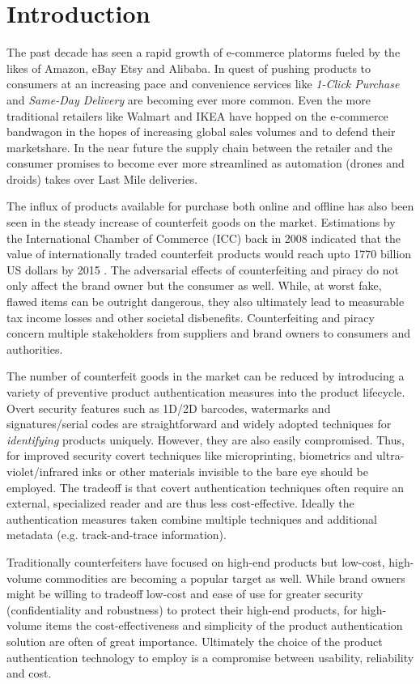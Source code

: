 \documentclass[thesis.tex]{subfiles}
\begin{document}
\chapter{Introduction}
\label{chapter:intro}

The past decade has seen a rapid growth of e-commerce platorms fueled by the likes of Amazon, eBay Etsy and Alibaba. In quest of pushing products to consumers at an increasing pace and convenience services like \emph{1-Click Purchase} and \emph{Same-Day Delivery} are becoming ever more common. Even the more traditional retailers like Walmart and IKEA have hopped on the e-commerce bandwagon in the hopes of increasing global sales volumes and to defend their marketshare. In the near future the supply chain between the retailer and the consumer promises to become ever more streamlined as automation (drones and droids) takes over Last Mile deliveries.

The influx of products available for purchase both online and offline has also been seen in the steady increase of counterfeit goods on the market. Estimations by the International Chamber of Commerce (ICC) back in 2008 indicated that the value of internationally traded counterfeit products would reach upto 1770 billion US dollars by 2015 \cite{icc}. The adversarial effects of counterfeiting and piracy do not only affect the brand owner but the consumer as well. While, at worst fake, flawed items can be outright dangerous, they also ultimately lead to measurable tax income losses and other societal disbenefits. Counterfeiting and piracy concern multiple stakeholders from suppliers and brand owners to consumers and authorities.

The number of counterfeit goods in the market can be reduced by introducing a variety of preventive product authentication measures into the product lifecycle. Overt security features such as 1D/2D barcodes, watermarks and signatures/serial codes are straightforward and widely adopted techniques for \emph{identifying} products uniquely. However, they are also easily compromised. Thus, for improved security covert techniques like microprinting, biometrics and ultra-violet/infrared inks or other materials invisible to the bare eye should be employed. The tradeoff is that covert authentication techniques often require an external, specialized reader and are thus less cost-effective. Ideally the authentication measures taken combine multiple techniques and additional metadata (e.g. track-and-trace information).

Traditionally counterfeiters have focused on high-end products but low-cost, high-volume commodities are becoming a popular target as well. While brand owners might be willing to tradeoff low-cost and ease of use for greater security (confidentiality and robustness) to protect their high-end products, for high-volume items the cost-effectiveness and simplicity of the product authentication solution are often of great importance. Ultimately the choice of the product authentication technology to employ is a compromise between usability, reliability and cost.
\end{document}

